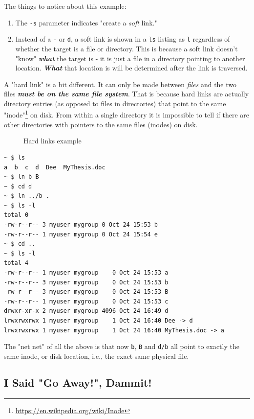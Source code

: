 \documentclass[10pt,]{book}
\renewcommand{\href}[2]{#2\footnote{\url{#1}}}
\numberwithin{figure}{chapter}
\DeclareRobustCommand{\drcap}[1]{\begin{figure}[H]\caption{#1}\end{figure}}
\begin{document}
The things to notice about this example:

\begin{enumerate}
\def\labelenumi{\arabic{enumi}.}
\item
  The \texttt{-s} parameter indicates "create a \emph{soft} link."
\item
  Instead of a \texttt{-} or \texttt{d}, a soft link is shown in a
  \texttt{ls} listing as \texttt{l} regardless of whether the target is
  a file or directory. This is because a soft link doesn't "know"
  \textbf{\emph{what}} the target is - it is just a file in a directory
  pointing to another location. \textbf{\emph{What}} that location is
  will be determined after the link is traversed.
\end{enumerate}

A "hard link" is a bit different. It can only be made
between \emph{files} and the two files \textbf{\emph{must be on the same
file system}}. That is because hard links are actually directory entries
(as opposed to files in directories) that point to the same
\href{https://en.wikipedia.org/wiki/Inode}{"inode"} on
disk. From within a single directory it is impossible to tell if there
are other directories with pointers to the same files (inodes) on disk.

\drcap{Hard links example}

\begin{verbatim}
~ $ ls
a  b  c  d  Dee  MyThesis.doc
~ $ ln b B
~ $ cd d
~ $ ln ../b .
~ $ ls -l
total 0
-rw-r--r-- 3 myuser mygroup 0 Oct 24 15:53 b
-rw-r--r-- 1 myuser mygroup 0 Oct 24 15:54 e
~ $ cd ..
~ $ ls -l
total 4
-rw-r--r-- 1 myuser mygroup    0 Oct 24 15:53 a
-rw-r--r-- 3 myuser mygroup    0 Oct 24 15:53 b
-rw-r--r-- 3 myuser mygroup    0 Oct 24 15:53 B
-rw-r--r-- 1 myuser mygroup    0 Oct 24 15:53 c
drwxr-xr-x 2 myuser mygroup 4096 Oct 24 16:49 d
lrwxrwxrwx 1 myuser mygroup    1 Oct 24 16:40 Dee -> d
lrwxrwxrwx 1 myuser mygroup    1 Oct 24 16:40 MyThesis.doc -> a
\end{verbatim}

The "net net" of all the above is that now \texttt{b}, \texttt{B} and
\texttt{d/b} all point to exactly the same inode, or disk location,
i.e., the exact same physical file.

\subsection*{I Said "Go Away!", Dammit!}\label{i-said-go-away-dammit}
\end{document}
